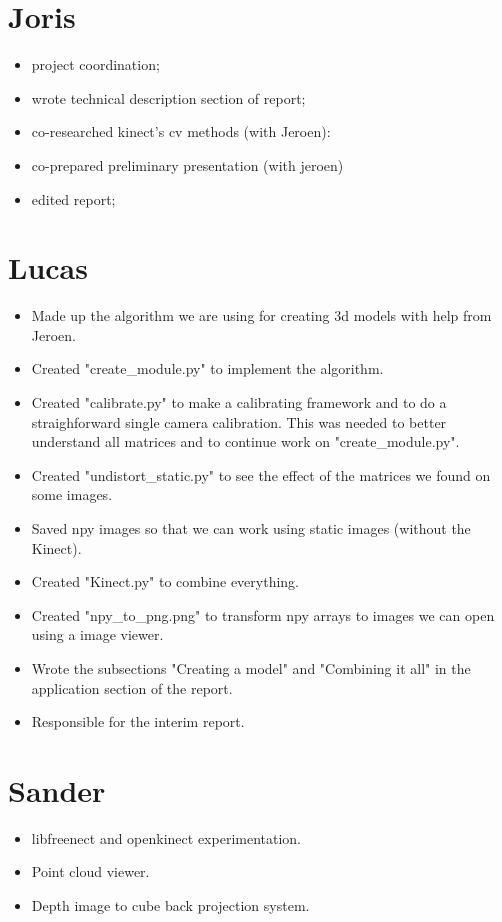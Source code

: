 \section*{Joris}
\begin{itemize}
    \item project coordination;
    \item wrote technical description section of report;
    \item co-researched kinect's cv methods (with Jeroen):
    \item co-prepared preliminary presentation (with jeroen)
    \item edited report;
\end{itemize}

\section*{Lucas}
\begin{itemize}
\item Made up the algorithm we are using for creating 3d models with help from Jeroen.
\item Created "create\_module.py" to implement the algorithm.
\item Created "calibrate.py" to make a calibrating framework and to do a 
straighforward single camera calibration. This was needed to better understand 
all matrices and to continue work on "create\_module.py".
\item Created "undistort\_static.py" to see the effect of the matrices we found on some images.
\item Saved npy images so that we can work using static images (without the Kinect).
\item Created "Kinect.py" to combine everything.
\item Created "npy\_to\_png.png" to transform npy arrays to images we can open 
using a image viewer.
\item Wrote the subsections "Creating a model" and "Combining it all" in the 
application section of the report.
\item Responsible for the interim report.
\end{itemize}

\section*{Sander}
\begin{itemize}
    \item libfreenect and openkinect experimentation.
    \item Point cloud viewer.
    \item Depth image to cube back projection system.
\end{itemize}
